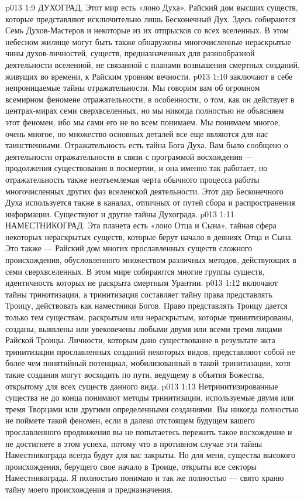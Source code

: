 \vs p013 1:9 \pc {}\bibnobreakspace ДУХОГРАД. Этот мир есть «лоно Духа», Райский дом высших существ, которые представляют исключительно лишь Бесконечный Дух. Здесь собираются Семь Духов\hyp{}Мастеров и некоторые из их отпрысков со всех вселенных. В этом небесном жилище могут быть также обнаружены многочисленные нераскрытые чины духов\hyp{}личностей, существ, предназначенных для разнообразной деятельности вселенной, не связанной с планами возвышения смертных созданий, живущих во времени, к Райским уровням вечности.
\vs p013 1:10 \pc {} заключают в себе непроницаемые тайны отражательности. Мы говорим вам об огромном всемирном феномене отражательности, в особенности, о том, как он действует в центрах\hyp{}мирах семи сверхвселенных, но мы никогда полностью не объясняем этот феномен, ибо мы сами его не во всем понимаем. Мы понимаем многое, очень многое, но множество основных деталей все еще являются для нас таинственными. Отражательность есть тайна Бога Духа. Вам было сообщено о деятельности отражательности в связи с программой восхождения --- продолжения существования в посмертии, и она именно так работает, но отражательность также неотъемлемая черта обычного процесса работы многочисленных других фаз вселенской деятельности. Этот дар Бесконечного Духа используется также в каналах, отличных от путей сбора и распространения информации. Существуют и другие тайны Духограда.
\vs p013 1:11 \pc {}\bibnobreakspace НАМЕСТНИКОГРАД. Эта планета есть «лоно Отца и Сына», тайная сфера некоторых нераскрытых существ, которые берут начало в деяниях Отца и Сына. Это также --- Райский дом многих прославленных существ сложного происхождения, обусловленного множеством различных методов, действующих в семи сверхвселенных. В этом мире собираются многие группы существ, идентичность которых не раскрыта смертным Урантии.
\vs p013 1:12 \pc {} включают тайны тринитизации, а тринитизация составляет тайну права представлять Троицу, действовать как наместники Богов. Право представлять Троицу дается только тем существам, раскрытым или нераскрытым, которые тринитизированы, созданы, выявлены или увековечены любыми двумя или всеми тремя лицами Райской Троицы. Личности, которым дано существование в результате акта тринитизации прославленных созданий некоторых видов, представляют собой не более чем понятийный потенциал, мобилизованный в такой тринитизации, хотя такие создания могут восходить по пути, ведущему в объятия Божества, открытому для всех существ данного вида.
\vs p013 1:13 Нетринитизированные существа не до конца понимают методы тринитизации, используемые двумя или тремя Творцами или другими определенными созданиями. Вы никогда полностью не поймете такой феномен, если в далеко отстоящем будущем вашего прославленного продвижения вы не попытаетесь пережить такое восхождение и не достигнете в этом успеха, потому что в противном случае эти тайны Наместникограда всегда будут для вас закрыты. Но для меня, существа высокого происхождения, берущего свое начало в Троице, открыты все секторы Наместникограда. Я полностью понимаю и так же полностью --- свято храню тайну моего происхождения и предназначения.
